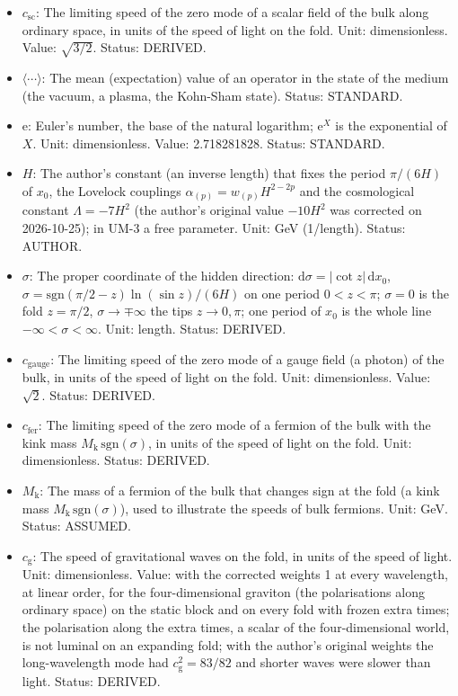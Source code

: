 \documentclass[
  10pt,
]{article}
\providecommand{\tightlist}{%
  \setlength{\itemsep}{0pt}\setlength{\parskip}{0pt}}
\begin{document}
\begin{itemize}
\tightlist
\item
  \(c_{\mathrm{sc}}\): The limiting speed of the zero mode of a scalar
  field of the bulk along ordinary space, in units of the speed of light
  on the fold. Unit: dimensionless. Value: \(\sqrt{3/2}\). Status:
  DERIVED.
\item
  \(\langle\cdots\rangle\): The mean (expectation) value of an operator
  in the state of the medium (the vacuum, a plasma, the Kohn-Sham
  state). Status: STANDARD.
\item
  \(\mathrm{e}\): Euler's number, the base of the natural logarithm;
  \(\mathrm{e}^{X}\) is the exponential of \(X\). Unit: dimensionless.
  Value: 2.718281828. Status: STANDARD.
\item
  \(H\): The author's constant (an inverse length) that fixes the period
  \(\pi/(6H)\) of \(x_0\), the Lovelock couplings
  \(\alpha_{(p)} = w_{(p)}H^{2-2p}\) and the cosmological constant
  \(\Lambda = -7H^2\) (the author's original value \(-10H^2\) was
  corrected on 2026-10-25); in UM-3 a free parameter. Unit: GeV
  (1/length). Status: AUTHOR.
\item
  \(\sigma\): The proper coordinate of the hidden direction:
  \(\mathrm{d}\sigma = \lvert\cot z\rvert\,\mathrm{d}x_0\),
  \(\sigma = \mathrm{sgn}(\pi/2 - z)\ln(\sin z)/(6H)\) on one period
  \(0 < z < \pi\); \(\sigma = 0\) is the fold \(z = \pi/2\),
  \(\sigma \to \mp\infty\) the tips \(z \to 0, \pi\); one period of
  \(x_0\) is the whole line \(-\infty < \sigma < \infty\). Unit: length.
  Status: DERIVED.
\item
  \(c_{\mathrm{gauge}}\): The limiting speed of the zero mode of a gauge
  field (a photon) of the bulk, in units of the speed of light on the
  fold. Unit: dimensionless. Value: \(\sqrt2\). Status: DERIVED.
\item
  \(c_{\mathrm{fer}}\): The limiting speed of the zero mode of a fermion
  of the bulk with the kink mass
  \(M_{\mathrm{k}}\,\mathrm{sgn}(\sigma)\), in units of the speed of
  light on the fold. Unit: dimensionless. Status: DERIVED.
\item
  \(M_{\mathrm{k}}\): The mass of a fermion of the bulk that changes
  sign at the fold (a kink mass
  \(M_{\mathrm{k}}\,\mathrm{sgn}(\sigma)\)), used to illustrate the
  speeds of bulk fermions. Unit: GeV. Status: ASSUMED.
\item
  \(c_{\mathrm{g}}\): The speed of gravitational waves on the fold, in
  units of the speed of light. Unit: dimensionless. Value: with the
  corrected weights 1 at every wavelength, at linear order, for the
  four-dimensional graviton (the polarisations along ordinary space) on
  the static block and on every fold with frozen extra times; the
  polarisation along the extra times, a scalar of the four-dimensional
  world, is not luminal on an expanding fold; with the author's original
  weights the long-wavelength mode had \(c_{\mathrm{g}}^2 = 83/82\) and
  shorter waves were slower than light. Status: DERIVED.
\end{itemize}
\end{document}
